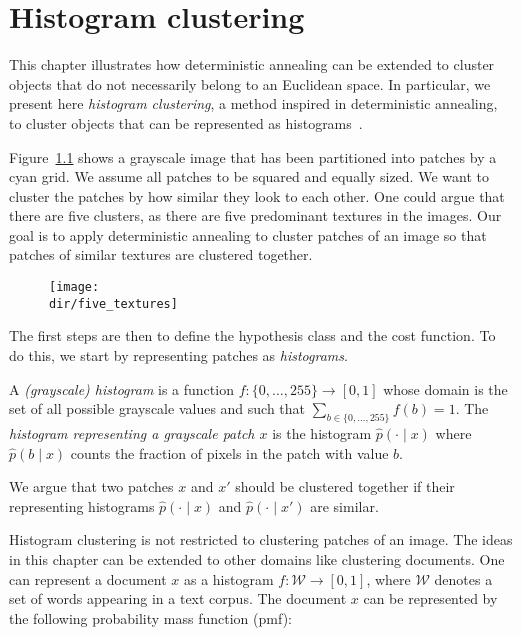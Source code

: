 \chapter{Histogram clustering}

This chapter illustrates how deterministic annealing can be extended to cluster objects that do not necessarily belong to an Euclidean space. In
particular, we present here \emph{histogram clustering}, a method inspired in deterministic
annealing, to cluster objects that can be represented as histograms~\cite{puzicha1999histogram}.

Figure~\ref{fig:image_partitioned} shows a grayscale image that has been partitioned into
patches by a cyan grid. We assume all patches to be squared and equally
sized. We want to cluster the patches by how similar they look to each
other. One could argue that there are five clusters, as there are five predominant
textures in the images. Our goal is to apply deterministic annealing
to cluster patches of an image so that patches of similar textures
are clustered together.

\begin{figure}[hbtp]
\centering
\texttt{[image: \\dir/five\_textures]}
\caption{}
\label{fig:image_partitioned}
\end{figure}

The first steps are then to define the hypothesis class and the cost function. To do this, we start by representing patches as \emph{histograms}.

\begin{definition}
A \emph{(grayscale) histogram} is a function $f : \{0, \ldots, 255\} \to [0,1]$ whose domain is the set of all possible grayscale values and such that $\sum_{b \in \{0, \ldots, 255\}} f(b) = 1$. The \emph{histogram representing a grayscale patch $x$} is the histogram $\hat{p}\left(\cdot \mid x\right)$ where $\hat{p}\left(b \mid x\right)$ counts the fraction of pixels in the patch with value $b$.
\end{definition}

We argue that two patches $x$ and $x'$ should be clustered together if their representing histograms $\hat{p}(\cdot \mid x)$ and $\hat{p}\left(\cdot \mid x'\right)$ are similar.

Histogram clustering is not restricted to clustering patches of an image.
The ideas in this chapter can be extended to other domains like clustering
documents. One can represent a document $x$ as a histogram $f : \mathcal{W} \to [0, 1]$,
where $\mathcal{W}$ denotes a set of words appearing in a text corpus. The document $x$ can be represented by the following probability mass function (pmf):

